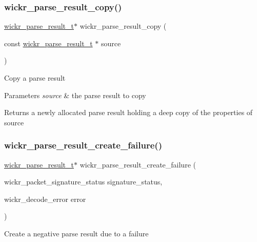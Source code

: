 \subsubsection{\texorpdfstring{wickr\+\_\+parse\+\_\+result\+\_\+copy()}{wickr\_parse\_result\_copy()}}
{\footnotesize\ttfamily \hyperlink{structwickr__parse__result}{wickr\+\_\+parse\+\_\+result\+\_\+t}$\ast$ wickr\+\_\+parse\+\_\+result\+\_\+copy (\begin{DoxyParamCaption}\item[{const \hyperlink{structwickr__parse__result}{wickr\+\_\+parse\+\_\+result\+\_\+t} $\ast$}]{source }\end{DoxyParamCaption})}

Copy a parse result


\begin{DoxyParams}{Parameters}
{\em source} & the parse result to copy \\
\hline
\end{DoxyParams}
\begin{DoxyReturn}{Returns}
a newly allocated parse result holding a deep copy of the properties of \textquotesingle{}source\textquotesingle{} 
\end{DoxyReturn}
\mbox{\label{group__wickr__protocol_gac2673bcfeae2f8d693e523809bb6bb30}} 
\subsubsection{\texorpdfstring{wickr\+\_\+parse\+\_\+result\+\_\+create\+\_\+failure()}{wickr\_parse\_result\_create\_failure()}}
{\footnotesize\ttfamily \hyperlink{structwickr__parse__result}{wickr\+\_\+parse\+\_\+result\+\_\+t}$\ast$ wickr\+\_\+parse\+\_\+result\+\_\+create\+\_\+failure (\begin{DoxyParamCaption}\item[{wickr\+\_\+packet\+\_\+signature\+\_\+status}]{signature\+\_\+status,  }\item[{wickr\+\_\+decode\+\_\+error}]{error }\end{DoxyParamCaption})}

Create a negative parse result due to a failure



